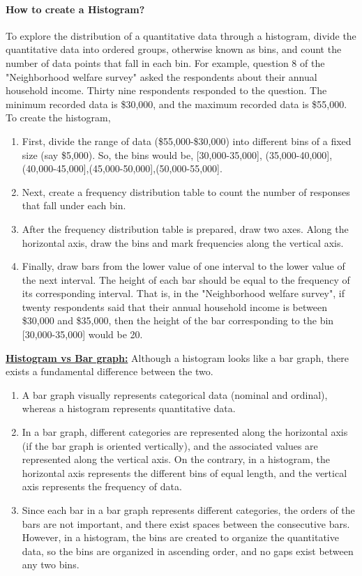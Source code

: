 \documentclass[a4paper, 11pt]{article}
\begin{document}
			\paragraph{How to create a Histogram?}
			To explore the distribution of a quantitative data through a histogram, divide the quantitative data into ordered groups, otherwise known as bins, and count the number of data points that fall in each bin. For example, question 8 of the "Neighborhood welfare survey" asked the respondents about their annual household income. Thirty nine respondents responded to the question. The minimum recorded data is \$30,000, and the maximum recorded data is \$55,000. To create the histogram, 
			\begin{enumerate}[label=(\alph*), noitemsep]
			\item
			First, divide the range of data (\$55,000-\$30,000) into different bins of a fixed size (say \$5,000). So, the bins would be, [30,000-35,000], (35,000-40,000],(40,000-45,000],(45,000-50,000],(50,000-55,000].
			\item
			Next, create a frequency distribution table to count the number of responses that fall under each bin.
			\item
			After the frequency distribution table is prepared, draw two axes. Along the horizontal axis, draw the bins and mark frequencies along the vertical axis. 
			\item
			Finally, draw bars from the lower value of one interval to the lower value of the next interval. The height of each bar should be equal to the frequency of its corresponding interval. That is, in the "Neighborhood welfare survey", if twenty respondents said that their annual household income is between \$30,000 and \$35,000, then the height of the bar corresponding to the bin [30,000-35,000] would be 20.
			\end{enumerate}
	\textbf{\underline{Histogram vs Bar graph:}} Although a histogram looks like a bar graph, there exists a fundamental difference between the two. 
	\begin{enumerate}[label=(\alph*), noitemsep]
		\item 
				A bar graph visually represents categorical data (nominal and ordinal), whereas a histogram represents quantitative data. 
		\item 
				In a bar graph, different categories are represented along the horizontal axis (if the bar graph is oriented vertically), and the associated values are represented along the vertical axis. On the contrary, in a histogram, the horizontal axis represents the different bins of equal length, and the vertical axis represents the frequency of data. 
		\item 
				Since each bar in a bar graph represents different categories, the orders of the bars are not important, and there exist spaces between the consecutive bars. However, in a histogram, the bins are created to organize the quantitative data, so the bins are organized in ascending order, and no gaps exist between any two bins.
	\end{enumerate}
%	
\end{document}
